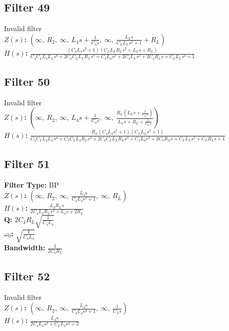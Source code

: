 \documentclass{article}
\begin{document}
\subsection*{Filter 49}
Invalid filter \\ 
\textbf{$Z(s)$:} $\left( \infty, \  R_{2}, \  \infty, \  L_{4} s + \frac{1}{C_{4} s}, \  \infty, \  \frac{L_{L} s}{C_{L} L_{L} s^{2} + 1} + R_{L}\right)$ \\ 
\textbf{$H(s)$:} $\frac{\left(C_{4} L_{4} s^{2} + 1\right) \left(C_{L} L_{L} R_{L} s^{2} + L_{L} s + R_{L}\right)}{C_{4} C_{L} L_{4} L_{L} s^{4} + 2 C_{4} C_{L} L_{L} R_{L} s^{3} + C_{4} L_{4} s^{2} + 2 C_{4} L_{L} s^{2} + 2 C_{4} R_{L} s + C_{L} L_{L} s^{2} + 1}$ \\ 
\subsection*{Filter 50}
Invalid filter \\ 
\textbf{$Z(s)$:} $\left( \infty, \  R_{2}, \  \infty, \  L_{4} s + \frac{1}{C_{4} s}, \  \infty, \  \frac{R_{L} \left(L_{L} s + \frac{1}{C_{L} s}\right)}{L_{L} s + R_{L} + \frac{1}{C_{L} s}}\right)$ \\ 
\textbf{$H(s)$:} $\frac{R_{L} \left(C_{4} L_{4} s^{2} + 1\right) \left(C_{L} L_{L} s^{2} + 1\right)}{C_{4} C_{L} L_{4} L_{L} s^{4} + C_{4} C_{L} L_{4} R_{L} s^{3} + 2 C_{4} C_{L} L_{L} R_{L} s^{3} + C_{4} L_{4} s^{2} + 2 C_{4} R_{L} s + C_{L} L_{L} s^{2} + C_{L} R_{L} s + 1}$ \\ 
\subsection*{Filter 51}
\textbf{Filter Type:} BP \\ 
\textbf{$Z(s)$:} $\left( \infty, \  R_{2}, \  \infty, \  \frac{L_{4} s}{C_{4} L_{4} s^{2} + 1}, \  \infty, \  R_{L}\right)$ \\ 
\textbf{$H(s)$:} $\frac{L_{4} R_{L} s}{2 C_{4} L_{4} R_{L} s^{2} + L_{4} s + 2 R_{L}}$ \\ 
\textbf{Q:} $2 C_{4} R_{L} \sqrt{\frac{1}{C_{4} L_{4}}}$ \\ 
\textbf{$\omega_0$:} $\sqrt{\frac{1}{C_{4} L_{4}}}$ \\ 
\textbf{Bandwidth:} $\frac{1}{2 C_{4} R_{L}}$ \\ 
\subsection*{Filter 52}
Invalid filter \\ 
\textbf{$Z(s)$:} $\left( \infty, \  R_{2}, \  \infty, \  \frac{L_{4} s}{C_{4} L_{4} s^{2} + 1}, \  \infty, \  \frac{1}{C_{L} s}\right)$ \\ 
\textbf{$H(s)$:} $\frac{L_{4} s}{2 C_{4} L_{4} s^{2} + C_{L} L_{4} s^{2} + 2}$ \\ 
\end{document}
